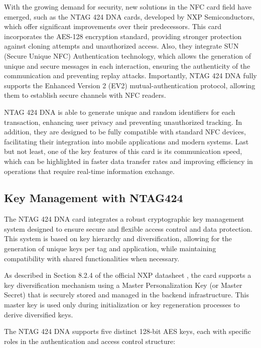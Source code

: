 With the growing demand for security, new solutions in the NFC card field have emerged, such as the NTAG 424 DNA \cite{ref29} cards, developed by NXP Semiconductors, which offer significant improvements over their predecessors. This card incorporates the AES-128 encryption standard, providing stronger protection against cloning attempts and unauthorized access. Also, they integrate SUN (Secure Unique NFC) Authentication technology, which allows the generation of unique and secure messages in each interaction, ensuring the authenticity of the communication and preventing replay attacks. Importantly, NTAG 424 DNA fully supports the Enhanced Version 2 (EV2) mutual-authentication protocol, allowing them to establish secure channels with NFC readers.

NTAG 424 DNA is able to generate unique and random identifiers for each transaction, enhancing user privacy and preventing unauthorized tracking. In addition, they are designed to be fully compatible with standard NFC devices, facilitating their integration into mobile applications and modern systems. Last but not least, one of the key features of this card is its communication speed, which can be highlighted in faster data transfer rates and improving efficiency in operations that require real-time information exchange.

\subsection{Key Management with NTAG424}

The NTAG 424 DNA card integrates a robust cryptographic key management system designed to ensure secure and flexible access control and data protection. This system is based on key hierarchy and diversification, allowing for the generation of unique keys per tag and application, while maintaining compatibility with shared functionalities when necessary.

As described in Section 8.2.4 of the official NXP datasheet \cite{ref42}, the card supports a key diversification mechanism using a Master Personalization Key (or Master Secret) that is securely stored and managed in the backend infrastructure. This master key is used only during initialization or key regeneration processes to derive diversified keys.

The NTAG 424 DNA supports five distinct 128-bit AES keys, each with specific roles in the authentication and access control structure:

